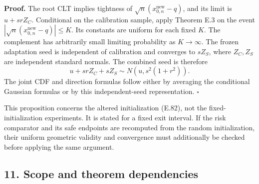 \textbf{Proof.} The root CLT implies tightness of
\(\sqrt n(x_{0,n}^{\mathrm{new}}-q)\), and its limit is \(u+srZ_C\).
Conditional on the calibration sample, apply Theorem E.3 on the event
\(|\sqrt n(x_{0,n}^{\mathrm{new}}-q)|\le K\). Its constants are uniform
for each fixed \(K\). The complement has arbitrarily small limiting
probability as \(K\to\infty\). The frozen adaptation seed is independent
of calibration and converges to \(sZ_S\), where \(Z_C,Z_S\) are
independent standard normals. The combined seed is therefore \[
u+srZ_C+sZ_S\sim N(u,s^2(1+r^2)).
\] The joint CDF and direction formulas follow either by averaging the
conditional Gaussian formulas or by this independent-seed
representation. \(\square\)

This proposition concerns the altered initialization (E.82), not the
fixed-initialization experiments. It is stated for a fixed exit
interval. If the risk comparator and its safe endpoints are recomputed
from the random initialization, their uniform geometric validity and
convergence must additionally be checked before applying the same
argument.

\subsection{11. Scope and theorem
dependencies}\label{risk_boundaries-scope-and-theorem-dependencies}

